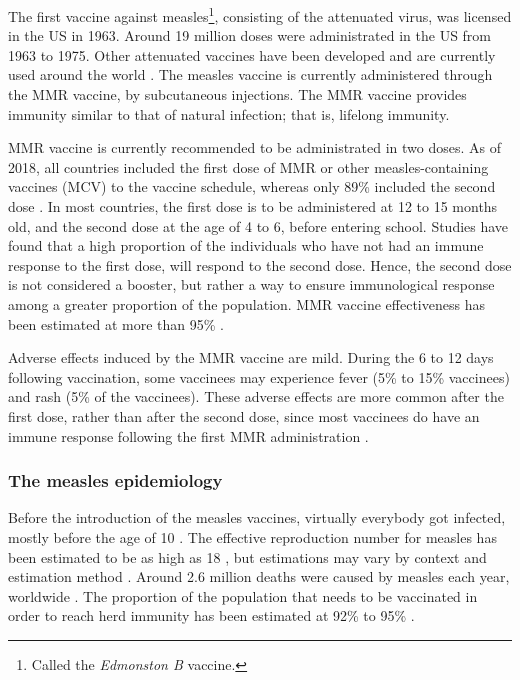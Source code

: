 The first vaccine against measles\footnote{Called the {\it Edmonston B} vaccine.}, consisting of the attenuated virus, was licensed in the US in 1963. Around 19 million doses were administrated in the US from 1963 to 1975. Other attenuated vaccines have been developed and are currently used around the world \cite[]{Strebel2013}. The measles vaccine is currently administered through the MMR vaccine, by subcutaneous injections. The MMR vaccine provides immunity similar to that of natural infection; that is, lifelong immunity. 

MMR vaccine is currently recommended to be administrated in two doses. As of 2018, all countries included the first dose of MMR or other measles-containing vaccines (MCV) to the vaccine schedule, whereas only 89\% included the second dose \cite[]{Peck2018}. In most countries, the first dose is to be administered at 12 to 15 months old, and the second dose at the age of 4 to 6, before entering school. Studies have found that a high proportion of the individuals who have not had an immune response to the first dose, will respond to the second dose. Hence, the second dose is not considered a booster, but rather a way to ensure immunological response among a greater proportion of the population. MMR vaccine effectiveness has been estimated at more than 95\% \cite[]{Strebel2013}.

Adverse effects induced by the MMR vaccine are mild. During the 6 to 12 days following vaccination, some vaccinees may experience fever (5\% to 15\% vaccinees) and rash (5\% of the vaccinees). These adverse effects are more common after the first dose, rather than after the second dose, since most vaccinees do have an immune response following the first MMR administration \cite[]{Strebel2013}.

\subsubsection{The measles epidemiology}
\label{sec:MeaslesEpi}

Before the introduction of the measles vaccines, virtually everybody got infected, mostly before the age of 10 \cite[]{Strebel2013}. The effective reproduction number for measles has been estimated to be as high as 18 \cite[]{Anderson1992}, but estimations may vary by context and estimation method \cite[]{Guerra2017}. Around 2.6 million deaths were caused by measles each year, worldwide \cite[]{WHO_Factsheet_Measles}. The proportion of the population that needs to be vaccinated in order to reach herd immunity has been estimated at 92\% to 95\% \cite[]{Strebel2013}. 

